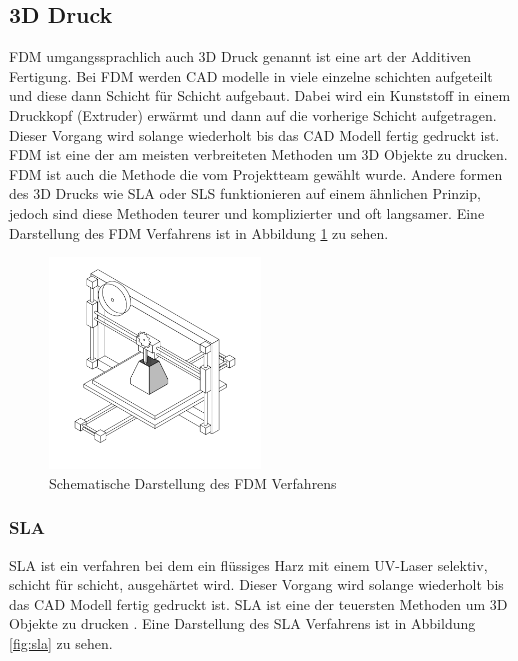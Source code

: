 \subsection{3D Druck}
\label{sec:3d_druck}

\ac{FDM} umgangssprachlich auch 3D Druck genannt ist eine art der Additiven Fertigung. Bei \ac{FDM} werden \ac{CAD} modelle in viele einzelne schichten aufgeteilt und diese dann Schicht für Schicht aufgebaut. Dabei wird ein Kunststoff in einem Druckkopf (Extruder) erwärmt und dann auf die vorherige Schicht aufgetragen. Dieser Vorgang wird solange wiederholt bis das \ac{CAD} Modell fertig gedruckt ist. \ac{FDM} ist eine der am meisten verbreiteten Methoden um 3D Objekte zu drucken. \ac{FDM} ist auch die Methode die vom Projektteam gewählt wurde. Andere formen des 3D Drucks wie \ac{SLA} oder \ac{SLS} funktionieren auf einem ähnlichen Prinzip, jedoch sind diese Methoden teurer und komplizierter und oft langsamer. Eine Darstellung des \ac{FDM} Verfahrens ist in Abbildung \ref{fig:fdm} zu sehen.

\begin{figure}[H]
    \centering
    \includegraphics[width=0.5\textwidth]{images/fdm.png}
    \caption{Schematische Darstellung des \ac{FDM} Verfahrens }
    \label{fig:fdm}
\end{figure}

\subsubsection{\ac{SLA}}

\ac{SLA} ist ein verfahren bei dem ein flüssiges Harz mit einem UV-Laser selektiv, schicht für schicht, ausgehärtet wird. Dieser Vorgang wird solange wiederholt bis das \ac{CAD} Modell fertig gedruckt ist. \ac{SLA} ist eine der teuersten Methoden um 3D Objekte zu drucken . Eine Darstellung des \ac{SLA} Verfahrens ist in Abbildung \ref{fig:sla} zu sehen.

